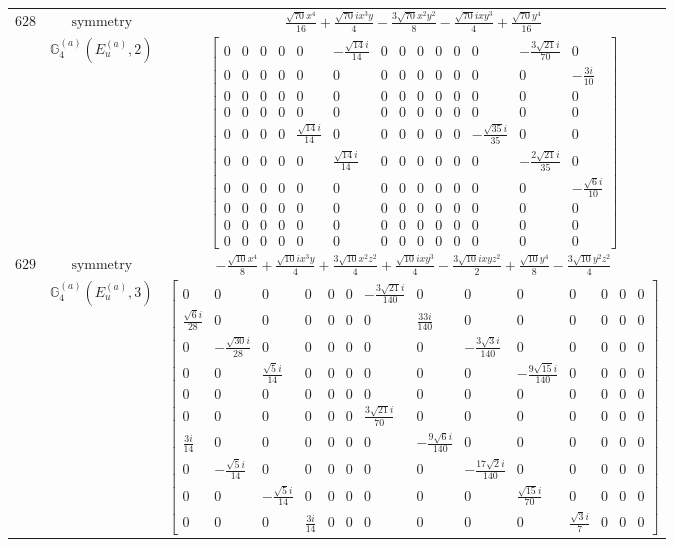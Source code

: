 \documentclass[fleqn,8pt,landscape]{jsarticle}
\begin{document}
\begin{longtable}{ccc}
$ 628 $ & $ \text{symmetry} $ & $ \frac{\sqrt{70} x^{4}}{16} + \frac{\sqrt{70} i x^{3} y}{4} - \frac{3 \sqrt{70} x^{2} y^{2}}{8} - \frac{\sqrt{70} i x y^{3}}{4} + \frac{\sqrt{70} y^{4}}{16} $ \\
$  $ & $ \mathbb{G}_{4}^{(a)}(E_{u}^{(a)},2) $ & $ \begin{bmatrix} 0 & 0 & 0 & 0 & 0 & - \frac{\sqrt{14} i}{14} & 0 & 0 & 0 & 0 & 0 & 0 & - \frac{3 \sqrt{21} i}{70} & 0 \\ 0 & 0 & 0 & 0 & 0 & 0 & 0 & 0 & 0 & 0 & 0 & 0 & 0 & - \frac{3 i}{10} \\ 0 & 0 & 0 & 0 & 0 & 0 & 0 & 0 & 0 & 0 & 0 & 0 & 0 & 0 \\ 0 & 0 & 0 & 0 & 0 & 0 & 0 & 0 & 0 & 0 & 0 & 0 & 0 & 0 \\ 0 & 0 & 0 & 0 & \frac{\sqrt{14} i}{14} & 0 & 0 & 0 & 0 & 0 & 0 & - \frac{\sqrt{35} i}{35} & 0 & 0 \\ 0 & 0 & 0 & 0 & 0 & \frac{\sqrt{14} i}{14} & 0 & 0 & 0 & 0 & 0 & 0 & - \frac{2 \sqrt{21} i}{35} & 0 \\ 0 & 0 & 0 & 0 & 0 & 0 & 0 & 0 & 0 & 0 & 0 & 0 & 0 & - \frac{\sqrt{6} i}{10} \\ 0 & 0 & 0 & 0 & 0 & 0 & 0 & 0 & 0 & 0 & 0 & 0 & 0 & 0 \\ 0 & 0 & 0 & 0 & 0 & 0 & 0 & 0 & 0 & 0 & 0 & 0 & 0 & 0 \\ 0 & 0 & 0 & 0 & 0 & 0 & 0 & 0 & 0 & 0 & 0 & 0 & 0 & 0 \end{bmatrix} $ \\ \hline
$ 629 $ & $ \text{symmetry} $ & $ - \frac{\sqrt{10} x^{4}}{8} + \frac{\sqrt{10} i x^{3} y}{4} + \frac{3 \sqrt{10} x^{2} z^{2}}{4} + \frac{\sqrt{10} i x y^{3}}{4} - \frac{3 \sqrt{10} i x y z^{2}}{2} + \frac{\sqrt{10} y^{4}}{8} - \frac{3 \sqrt{10} y^{2} z^{2}}{4} $ \\
$  $ & $ \mathbb{G}_{4}^{(a)}(E_{u}^{(a)},3) $ & $ \begin{bmatrix} 0 & 0 & 0 & 0 & 0 & 0 & - \frac{3 \sqrt{21} i}{140} & 0 & 0 & 0 & 0 & 0 & 0 & 0 \\ \frac{\sqrt{6} i}{28} & 0 & 0 & 0 & 0 & 0 & 0 & \frac{33 i}{140} & 0 & 0 & 0 & 0 & 0 & 0 \\ 0 & - \frac{\sqrt{30} i}{28} & 0 & 0 & 0 & 0 & 0 & 0 & - \frac{3 \sqrt{3} i}{140} & 0 & 0 & 0 & 0 & 0 \\ 0 & 0 & \frac{\sqrt{5} i}{14} & 0 & 0 & 0 & 0 & 0 & 0 & - \frac{9 \sqrt{15} i}{140} & 0 & 0 & 0 & 0 \\ 0 & 0 & 0 & 0 & 0 & 0 & 0 & 0 & 0 & 0 & 0 & 0 & 0 & 0 \\ 0 & 0 & 0 & 0 & 0 & 0 & \frac{3 \sqrt{21} i}{70} & 0 & 0 & 0 & 0 & 0 & 0 & 0 \\ \frac{3 i}{14} & 0 & 0 & 0 & 0 & 0 & 0 & - \frac{9 \sqrt{6} i}{140} & 0 & 0 & 0 & 0 & 0 & 0 \\ 0 & - \frac{\sqrt{5} i}{14} & 0 & 0 & 0 & 0 & 0 & 0 & - \frac{17 \sqrt{2} i}{140} & 0 & 0 & 0 & 0 & 0 \\ 0 & 0 & - \frac{\sqrt{5} i}{14} & 0 & 0 & 0 & 0 & 0 & 0 & \frac{\sqrt{15} i}{70} & 0 & 0 & 0 & 0 \\ 0 & 0 & 0 & \frac{3 i}{14} & 0 & 0 & 0 & 0 & 0 & 0 & \frac{\sqrt{3} i}{7} & 0 & 0 & 0 \end{bmatrix} $ \\ \hline

\end{longtable}
\end{document}
